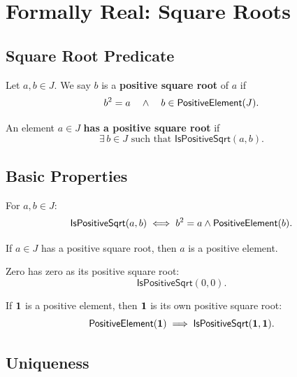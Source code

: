 \section{Formally Real: Square Roots}

\subsection{Square Root Predicate}

\begin{definition}[IsPositiveSqrt]
Let $a, b \in J$. We say $b$ is a \textbf{positive square root} of $a$ if
\[ b^{2} = a \quad \land \quad b \in \mathsf{PositiveElement}(J). \]
\end{definition}

\begin{definition}[HasPositiveSqrt]
An element $a \in J$ \textbf{has a positive square root} if
\[ \exists\, b \in J \text{ such that } \mathsf{IsPositiveSqrt}(a, b). \]
\end{definition}

\subsection{Basic Properties}

\begin{lemma}
For $a, b \in J$:
\[ \mathsf{IsPositiveSqrt}(a, b) \iff b^{2} = a \land \mathsf{PositiveElement}(b). \]
\end{lemma}

\begin{theorem}
If $a \in J$ has a positive square root, then $a$ is a positive element.
\end{theorem}

\begin{lemma}
Zero has zero as its positive square root:
\[ \mathsf{IsPositiveSqrt}(0, 0). \]
\end{lemma}

\begin{lemma}
If $\mathbf{1}$ is a positive element, then $\mathbf{1}$ is its own positive square root:
\[ \mathsf{PositiveElement}(\mathbf{1}) \implies \mathsf{IsPositiveSqrt}(\mathbf{1}, \mathbf{1}). \]
\end{lemma}

\subsection{Uniqueness}


